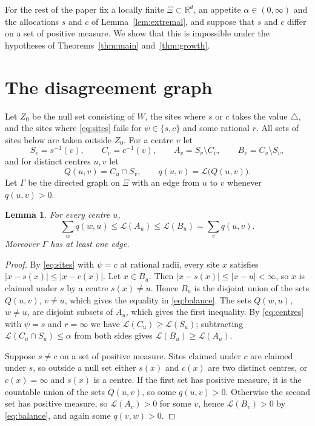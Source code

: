 \documentclass[11pt]{amsart}
\newtheorem{lemma}[theorem]{Lemma}
\theoremstyle{remark}
\numberwithin{equation}{section}
\newcommand{\R}{\mathbb{R}}
\newcommand{\Leb}{\mathcal{L}}
\newcommand{\nodef}{\triangle}
\begin{document}
For the rest of the paper fix a locally finite $\Xi\subset\R^d$, an appetite $\alpha\in(0,\infty)$ and the allocations $s$ and $c$ of Lemma~\ref{lem:extremal}, and suppose that $s$ and $c$ differ on a set of positive measure. We show that this is impossible under the hypotheses of Theorems~\ref{thm:main} and~\ref{thm:growth}.

\section{The disagreement graph}\label{sec:graph}

Let $Z_0$ be the null set consisting of $W$, the sites where $s$ or $c$ takes the value $\nodef$, and the sites where \eqref{eq:sites} fails for $\psi\in\{s,c\}$ and some rational $r$. All sets of sites below are taken outside $Z_0$. For a centre $v$ let
\[
S_v=s^{-1}(v),\qquad C_v=c^{-1}(v),\qquad A_v=S_v\setminus C_v,\qquad B_v=C_v\setminus S_v,
\]
and for distinct centres $u,v$ let
\[
Q(u,v)=C_u\cap S_v,\qquad q(u,v)=\Leb\bigl(Q(u,v)\bigr).
\]
Let $\Gamma$ be the directed graph on $\Xi$ with an edge from $u$ to $v$ whenever $q(u,v)>0$.

\begin{lemma}\label{lem:balance}
For every centre $u$,
\begin{equation}\label{eq:balance}
\sum_{w}q(w,u)\le\Leb(A_u)\le\Leb(B_u)=\sum_{v}q(u,v).
\end{equation}
Moreover $\Gamma$ has at least one edge.
\end{lemma}

\begin{proof}
By \eqref{eq:sites} with $\psi=c$ at rational radii, every site $x$ satisfies $|x-s(x)|\le|x-c(x)|$. Let $x\in B_u$. Then $|x-s(x)|\le|x-u|<\infty$, so $x$ is claimed under $s$ by a centre $s(x)\ne u$. Hence $B_u$ is the disjoint union of the sets $Q(u,v)$, $v\ne u$, which gives the equality in \eqref{eq:balance}. The sets $Q(w,u)$, $w\ne u$, are disjoint subsets of $A_u$, which gives the first inequality. By \eqref{eq:centres} with $\psi=s$ and $r=\infty$ we have $\Leb(C_u)\ge\Leb(S_u)$; subtracting $\Leb(C_u\cap S_u)\le\alpha$ from both sides gives $\Leb(B_u)\ge\Leb(A_u)$.

Suppose $s\ne c$ on a set of positive measure. Sites claimed under $c$ are claimed under $s$, so outside a null set either $s(x)$ and $c(x)$ are two distinct centres, or $c(x)=\infty$ and $s(x)$ is a centre. If the first set has positive measure, it is the countable union of the sets $Q(u,v)$, so some $q(u,v)>0$. Otherwise the second set has positive measure, so $\Leb(A_v)>0$ for some $v$, hence $\Leb(B_v)>0$ by \eqref{eq:balance}, and again some $q(v,w)>0$.
\end{proof}
\end{document}
